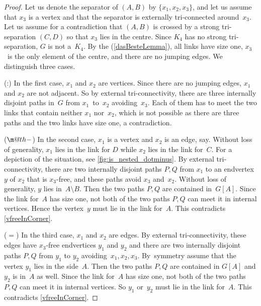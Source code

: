 \documentclass{aic}
\makeatletter
\theoremstyle{plain}
\theoremstyle{definition}
\theoremstyle{plain}
\newcommand{\dotminus}{\mathbin{\text{\@dotminus}}}
\newcommand{\@dotminus}{%
  \ooalign{\hidewidth\raise1.2ex\hbox{.}\hidewidth\cr$\m@th-$\cr}%
}
\theoremstyle{plain}
\newcommand{\sm}{\setminus}
\makeatother
\begin{document}
\begin{proof}
Let us denote the separator of $(A,B)$ by $\{x_1,x_2,x_3\}$, and let us assume that $x_3$ is a vertex and that the separator is externally tri-connected around~$x_3$.
Let us assume for a 
contradiction that $(A,B)$ is crossed by a strong tri-separation $(C,D)$ so that $x_3$ lies in the centre.
Since $K_4$ has no strong tri-separation, $G$ is not a~$K_4$. By the  (\ref{dasBesteLemma}), all links have size one, $x_3$~is the only element of the centre, and there are no jumping edges.
We distinguish three cases. 

(:) In the first case, $x_1$ and $x_2$ are vertices. 
Since there are no jumping edges, 
$x_1$ and $x_2$ are not adjacent. So by external tri-connectivity, there are three internally 
disjoint paths in~$G$ from $x_1$~to~$x_2$ avoiding~$x_3$. Each of them has to meet the two links that contain neither $x_1$ nor~$x_2$, which is not possible as there are three paths and the two links have size one, a contradiction.

($\dotminus$) In the second case, $x_1$ is a vertex and $x_2$ is an edge, say.
Without loss of generality, $x_1$ lies in the link for $D$ while $x_2$ lies in the link for~$C$.
For a depiction of the situation, see \autoref{fig:is_nested_dotminus}.
By external 
tri-connectivity, there are two internally 
disjoint paths $P,Q$ from $x_1$ to an endvertex $y$ of $x_2$ that is $x_3$-free, and these paths avoid  
$x_3$ and~$x_2$. 
Without loss of generality, $y$ lies in~$A\sm B$.
Then the two paths $P,Q$ are contained in~$G[A]$.
Since the link for~$A$ has size one, not both of the two paths $P,Q$ can meet it in internal vertices.
Hence the vertex~$y$ must lie in the link for~$A$.
This contradicts \autoref{vfreeInCorner}.

($=$) In the third case, $x_1$ and $x_2$ are edges. By external 
tri-connectivity, these edges have $x_3$-free endvertices $y_1$ and $y_2$ and there are two 
internally 
disjoint paths $P,Q$ from $y_1$ to $y_2$ avoiding~$x_1, x_2,x_3$. 
By~symmetry assume that the vertex $y_1$ lies in the side~$A$. 
Then the two paths $P,Q$ are contained in $G[A]$ and $y_2$ is in~$A$ as well. 
Since the link for~$A$ has size one, not both of the two paths~$P,Q$ can meet it in internal vertices.
So $y_1$ or~$y_2$ must lie in the link for~$A$.
This contradicts \autoref{vfreeInCorner}. 
\end{proof}
\end{document}
